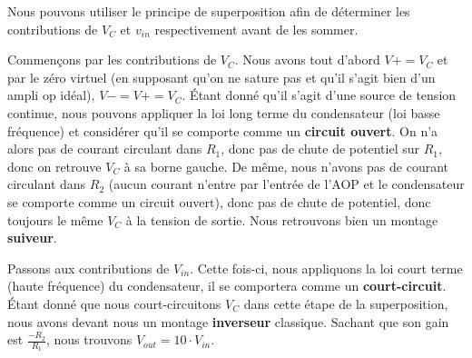 \documentclass{../template/tp}
\begin{document}
{

Nous pouvons utiliser le principe de superposition afin de déterminer les contributions de $V_C$ et $v_{in}$ respectivement avant de les sommer.

Commençons par les contributions de $V_C$.
Nous avons tout d'abord $V+ = V_C$ et par le zéro virtuel (en supposant qu'on ne sature pas et qu'il s'agit bien d'un ampli op idéal), $V- = V+ = V_C$.
Étant donné qu'il s'agit d'une source de tension continue, nous pouvons appliquer la loi long terme du condensateur (loi basse fréquence) et considérer qu'il se comporte comme un \textbf{circuit ouvert}.
On n'a alors pas de courant circulant dans $R_1$, donc pas de chute de potentiel sur $R_1$, donc on retrouve $V_C$ à sa borne gauche.
De même, nous n'avons pas de courant circulant dans $R_2$ (aucun courant n'entre par l'entrée de l'AOP et le condensateur se comporte comme un circuit ouvert), donc pas de chute de potentiel, donc toujours le même $V_C$ à la tension de sortie.
Nous retrouvons bien un montage \textbf{suiveur}.

Passons aux contributions de $V_{in}$. Cette fois-ci, nous appliquons la loi court terme (haute fréquence) du condensateur, il se comportera comme un \textbf{court-circuit}.
Étant donné que nous court-circuitons $V_C$ dans cette étape de la superposition, nous avons devant nous un montage \textbf{inverseur} classique.
Sachant que son gain est $\frac{- R_2}{R_1}$, nous trouvons $V_{out} = 10 \cdot V_{in}$.


}
\end{document}
